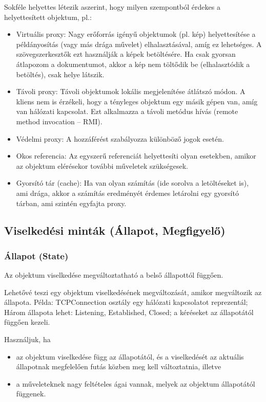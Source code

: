 \documentclass[margin=0px]{article}
\begin{document}
Sokféle helyettes létezik aszerint, hogy milyen szempontból érdekes a helyettesített objektum, pl.:
\begin{itemize}
    \item Virtuális proxy: Nagy erőforrás igényű objektumok (pl. kép) helyettesítése a példányosítás (vagy más drága művelet) elhalasztásával, amíg ez lehetséges. A szövegszerkesztők ezt használják a képek betöltésére. Ha csak gyorsan átlapozom a dokumentumot, akkor a kép nem töltődik be (elhalasztódik a betöltés), csak helye látszik.
    \item Távoli proxy: Távoli objektumok lokális megjelenítése átlátszó módon. A kliens nem is érzékeli, hogy a tényleges objektum egy másik gépen van, amíg van hálózati kapcsolat. Ezt alkalmazza a távoli metódus hívás (remote method invocation – RMI).
    \item Védelmi proxy: A hozzáférést szabályozza különböző jogok esetén.
    \item Okos referencia: Az egyszerű referenciát helyettesíti olyan esetekben, amikor az objektum elérésekor további műveletek szükségesek.
    \item Gyorsító tár (cache): Ha van olyan számítás (ide sorolva a letöltéseket is), ami drága, akkor a számítás eredményét érdemes letárolni egy gyorsító tárban, ami szintén egyfajta proxy.
\end{itemize}

\subsection{Viselkedési minták (Állapot, Megfigyelő)}

\subsubsection{Állapot (State)}
Az objektum viselkedése megváltoztatható a belső állapottól függően.

Lehetővé teszi egy objektum viselkedésének megváltozását, amikor megváltozik az állapota. Példa: TCPConnection osztály egy hálózati kapcsolatot reprezentál; Három állapota lehet: Listening, Established, Closed; a kéréseket az állapotától függően kezeli.

Használjuk, ha
\begin{itemize}
    \item az objektum viselkedése függ az állapotától, és a viselkedését az aktuális állapotnak megfelelően futás közben meg kell változtatnia, illetve
    \item a műveleteknek nagy feltételes ágai vannak, melyek az objektum állapotától függenek.
\end{itemize}
\end{document}
